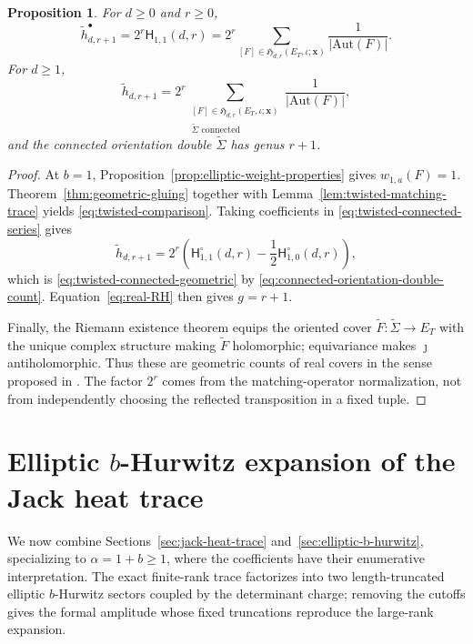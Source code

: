 \documentclass[11pt,a4paper,reqno]{article}
\newtheorem{proposition}[theorem]{Proposition}
\theoremstyle{definition}
\theoremstyle{remark}
\newcommand\Hb{{\mathsf H}}
\newcommand\Aut{{\mathrm{Aut}}}
\begin{document}
\begin{proposition}\label{prop:twisted-real-monodromy}
For $d\geq0$ and $r\geq0$,
\begin{equation}\label{eq:twisted-comparison}
\widetilde h_{d,r+1}^{\bullet} =2^r\Hb_{1,1}(d,r) =2^r\sum_{[F]\in\mathfrak H_{d,r}(E_T,\iota;\mathbf x)}\frac1{|\Aut(F)|}.
\end{equation}
For $d\geq1$,
\begin{equation}\label{eq:twisted-connected-geometric}
\widetilde h_{d,r+1}=2^r\sum_{\substack{[F]\in\mathfrak H_{d,r}(E_T,\iota;\mathbf x)\\
\widetilde\Sigma\text{ connected}}}\frac1{|\Aut(F)|},
\end{equation}
and the connected orientation double $\widetilde\Sigma$ has genus $r+1$.
\end{proposition}

\begin{proof}
At $b=1$, Proposition~\ref{prop:elliptic-weight-properties} gives $w_{1,a}(F)=1$.  Theorem~\ref{thm:geometric-gluing} together with Lemma~\ref{lem:twisted-matching-trace} yields \eqref{eq:twisted-comparison}.  Taking coefficients in \eqref{eq:twisted-connected-series} gives
\[
\widetilde h_{d,r+1} =2^r\left(\Hb^\circ_{1,1}(d,r)-\frac12\Hb^\circ_{1,0}(d,r)\right),
\]
which is \eqref{eq:twisted-connected-geometric} by \eqref{eq:connected-orientation-double-count}.  Equation~\eqref{eq:real-RH} then gives $g=r+1$.

Finally, the Riemann existence theorem equips the oriented cover $\widetilde F:\widetilde\Sigma\to E_T$ with the unique complex structure making $\widetilde F$ holomorphic; equivariance makes $\jmath$ antiholomorphic.  Thus these are geometric counts of real covers in the sense proposed in \cite[Remark~5]{HahnMarkwig26}.  The factor $2^r$ comes from the matching-operator normalization, not from independently choosing the reflected transposition in a fixed tuple.
\end{proof}

\section{Elliptic $b$-Hurwitz expansion of the Jack heat trace}\label{sec:heat-trace-expansion}

We now combine Sections~\ref{sec:jack-heat-trace} and~\ref{sec:elliptic-b-hurwitz}, specializing to $\alpha=1+b\geq1$, where the coefficients have their enumerative interpretation.  The exact finite-rank trace factorizes into two length-truncated elliptic $b$-Hurwitz sectors coupled by the determinant charge; removing the cutoffs gives the formal amplitude whose fixed truncations reproduce the large-rank expansion.
\end{document}
